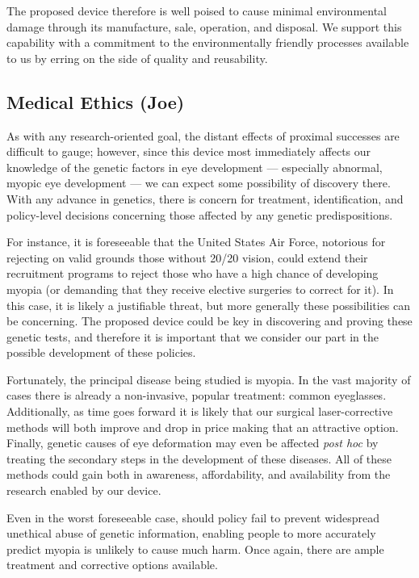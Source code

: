\documentclass{article}
\begin{document}
The proposed device therefore is well poised to cause minimal
environmental damage through its manufacture, sale, operation, and
disposal. We support this capability with a commitment to the
environmentally friendly processes available to us by erring on the
side of quality and reusability.
 
 
\subsection{Medical Ethics (Joe)}
\label{sec:blah-blah-blah}
 
As with any research-oriented goal, the distant effects of proximal
successes are difficult to gauge; however, since this device most
immediately affects our knowledge of the genetic factors in eye
development --- especially abnormal, myopic eye development --- we can
expect some possibility of discovery there. With any advance in
genetics, there is concern for treatment, identification, and
policy-level decisions concerning those affected by any genetic
predispositions.
 
For instance, it is foreseeable that the United States Air Force, notorious for
rejecting on valid grounds those without 20/20 vision, could extend
their recruitment programs to reject those who have a high chance of
developing myopia (or demanding that they receive elective surgeries
to correct for it). In this case, it is likely a justifiable threat,
but more generally these possibilities can be concerning. The proposed
device could be key in discovering and proving these genetic tests,
and therefore it is important that we consider our part in the
possible development of these policies.
 
Fortunately, the principal disease being studied is myopia. In the
vast majority of cases there is already a non-invasive, popular
treatment: common eyeglasses. Additionally, as time goes forward it is
likely that our surgical laser-corrective methods will both improve
and drop in price making that an attractive option. Finally, genetic
causes of eye deformation may even be affected \textit{post hoc} by
treating the secondary steps in the development of these diseases. All
of these methods could gain both in awareness, affordability, and
availability from the research enabled by our device.
 
Even in the worst foreseeable case, should policy fail to prevent
widespread unethical abuse of genetic information, enabling people to
more accurately predict myopia is unlikely to cause much harm. Once
again, there are ample treatment and corrective options available.
 
\end{document}
